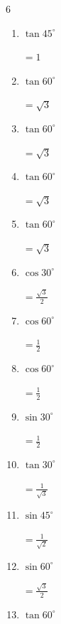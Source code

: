 \begin{multicols}{6}
\begin{enumerate}
        $\displaystyle =\frac{1}{\sqrt{2}}$

  \item $\displaystyle \tan{45^\circ}$

        $\displaystyle =1$

  \item $\displaystyle \tan{60^\circ}$

        $\displaystyle =\sqrt{3}$

  \item $\displaystyle \tan{60^\circ}$

        $\displaystyle =\sqrt{3}$

  \item $\displaystyle \tan{60^\circ}$

        $\displaystyle =\sqrt{3}$

  \item $\displaystyle \tan{60^\circ}$

        $\displaystyle =\sqrt{3}$

  \item $\displaystyle \cos{30^\circ}$

        $\displaystyle =\frac{\sqrt{3}}{2}$

  \item $\displaystyle \cos{60^\circ}$

        $\displaystyle =\frac{1}{2}$

  \item $\displaystyle \cos{60^\circ}$

        $\displaystyle =\frac{1}{2}$

  \item $\displaystyle \sin{30^\circ}$

        $\displaystyle =\frac{1}{2}$

  \item $\displaystyle \tan{30^\circ}$

        $\displaystyle =\frac{1}{\sqrt{3}}$

  \item $\displaystyle \sin{45^\circ}$

        $\displaystyle =\frac{1}{\sqrt{2}}$

  \item $\displaystyle \sin{60^\circ}$

        $\displaystyle =\frac{\sqrt{3}}{2}$

\columnbreak %

\resetques

  \item $\displaystyle \tan{60^\circ}$


\end{enumerate}
\end{multicols}
